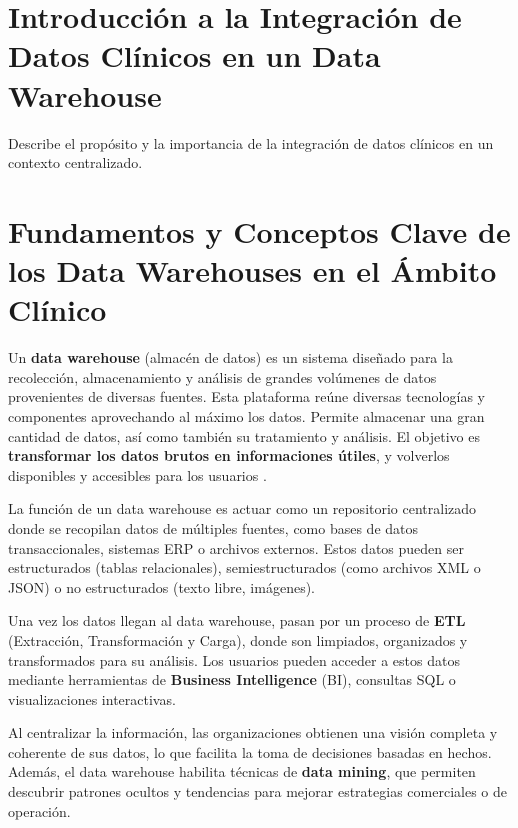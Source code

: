 \documentclass[12pt, a4paper, twoside]{article}
\begin{document}
	
	
	
	\clearpage
	\setcounter{page}{1}
	
	
	
	\tableofcontents
	\newpage
	
	\section{Introducción a la Integración de Datos Clínicos en un Data Warehouse}
	Describe el propósito y la importancia de la integración de datos clínicos en un contexto centralizado.
	
	\section{Fundamentos y Conceptos Clave de los Data Warehouses en el Ámbito Clínico}
	
	Un \textbf{data warehouse} (almacén de datos) es un sistema diseñado para la recolección, almacenamiento y análisis de grandes volúmenes de datos provenientes de diversas fuentes. Esta plataforma reúne diversas tecnologías y componentes aprovechando al máximo los datos. Permite almacenar una gran cantidad de datos, así como también su tratamiento y análisis. El objetivo es \textbf{transformar los datos brutos en informaciones útiles}, y volverlos disponibles y accesibles para los usuarios \cite{Portal2017}.
	
	La función de un data warehouse es actuar como un repositorio centralizado donde se recopilan datos de múltiples fuentes, como bases de datos transaccionales, sistemas ERP o archivos externos. Estos datos pueden ser estructurados (tablas relacionales), semiestructurados (como archivos XML o JSON) o no estructurados (texto libre, imágenes)\cite{Portal2017}.
	
	Una vez los datos llegan al data warehouse, pasan por un proceso de \textbf{ETL} (Extracción, Transformación y Carga), donde son limpiados, organizados y transformados para su análisis. Los usuarios pueden acceder a estos datos mediante herramientas de \textbf{Business Intelligence} (BI), consultas SQL o visualizaciones interactivas.
	
	Al centralizar la información, las organizaciones obtienen una visión completa y coherente de sus datos, lo que facilita la toma de decisiones basadas en hechos. Además, el data warehouse habilita técnicas de \textbf{data mining}, que permiten descubrir patrones ocultos y tendencias para mejorar estrategias comerciales o de operación\cite{kimball2013}.
	
\end{document}
